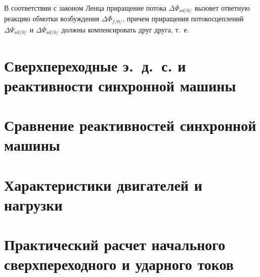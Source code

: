 В соответствии с законом Ленца приращение потока $ \Delta \overset{\;.}{\Phi}_{ad/0/} $ вызовет ответную реакцию обмотки возбуждения $ \Delta \overset{\;.}{\Phi}_{f/0/} $, причем приращения потокосцеплений $ \Delta \overset{\;.}{\Psi }_{ad/0/} $ и $ \Delta \overset{\;.}{\Psi }_{ad/0/} $ должны компенсировать друг друга, т.~е.

\section{Сверхпереходные э.~д.~с. и реактивности синхронной машины}
\label{sec:6-3}


\section{Сравнение реактивностей синхронной машины}
\label{sec:6-4}


\section{Характеристики двигателей и нагрузки}
\label{sec:6-5}


\section{Практический расчет начального сверхпереходного и ударного токов}
\label{sec:6-6}